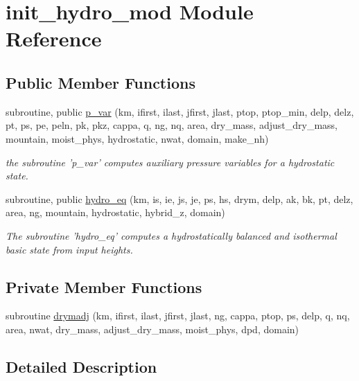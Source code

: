 \section{init\-\_\-hydro\-\_\-mod Module Reference}
\label{classinit__hydro__mod}
\subsection*{Public Member Functions}
\begin{DoxyCompactItemize}
\item 
subroutine, public \hyperlink{classinit__hydro__mod_a23f39e1b3ac489c6fd3d7178569ee85f}{p\-\_\-var} (km, ifirst, ilast, jfirst, jlast, ptop, ptop\-\_\-min, delp, delz, pt, ps, pe, peln, pk, pkz, cappa, q, ng, nq, area, dry\-\_\-mass, adjust\-\_\-dry\-\_\-mass, mountain, moist\-\_\-phys, hydrostatic, nwat, domain, make\-\_\-nh)
\begin{DoxyCompactList}\small\item\em the subroutine 'p\-\_\-var' computes auxiliary pressure variables for a hydrostatic state. \end{DoxyCompactList}\item 
subroutine, public \hyperlink{classinit__hydro__mod_a645ace2e31d16bce04805dde9ef98b73}{hydro\-\_\-eq} (km, is, ie, js, je, ps, hs, drym, delp, ak, bk, pt, delz, area, ng, mountain, hydrostatic, hybrid\-\_\-z, domain)
\begin{DoxyCompactList}\small\item\em The subroutine 'hydro\-\_\-eq' computes a hydrostatically balanced and isothermal basic state from input heights. \end{DoxyCompactList}\end{DoxyCompactItemize}
\subsection*{Private Member Functions}
\begin{DoxyCompactItemize}
\item 
subroutine \hyperlink{classinit__hydro__mod_a0e61f31967e9961d1c4ea3b78ac5b920}{drymadj} (km, ifirst, ilast, jfirst, jlast, ng, cappa, ptop, ps, delp, q, nq, area, nwat, dry\-\_\-mass, adjust\-\_\-dry\-\_\-mass, moist\-\_\-phys, dpd, domain)
\end{DoxyCompactItemize}


\subsection{Detailed Description}


